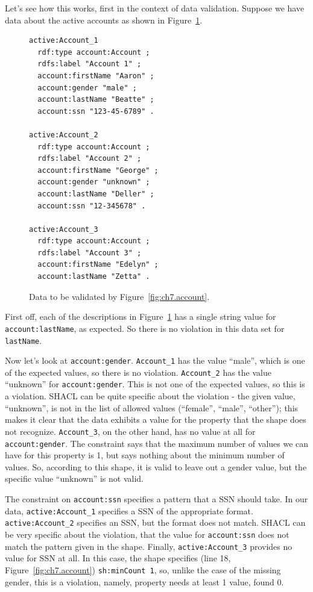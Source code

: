 Let's see how this works, first in the context
of data validation.  Suppose we have data about the active accounts as shown in
Figure~\ref{fig:ch7.data}.


\begin{figure}
  \begin{lstlisting}
active:Account_1
  rdf:type account:Account ;
  rdfs:label "Account 1" ;
  account:firstName "Aaron" ;
  account:gender "male" ;
  account:lastName "Beatte" ;
  account:ssn "123-45-6789" .

active:Account_2
  rdf:type account:Account ;
  rdfs:label "Account 2" ;
  account:firstName "George" ;
  account:gender "unknown" ;
  account:lastName "Deller" ;
  account:ssn "12-345678" .

active:Account_3
  rdf:type account:Account ;
  rdfs:label "Account 3" ;
  account:firstName "Edelyn" ;
  account:lastName "Zetta" .
  \end{lstlisting}
\label{fig:ch7.data}
\caption{Data to be validated by Figure~\protect\ref{fig:ch7.account}.}
\end{figure}

First off, each of the descriptions in Figure~\ref{fig:ch7.data} has a single string value for
\texttt{account:lastName}, as expected.  So there is no violation in this data set for \texttt{lastName}.

Now let's look at \texttt{account:gender}.  \texttt{Account\_1} has the
value ``male'', which is one of the expected values, so there is no
violation.  \texttt{Account\_2} has the value ``unknown'' for \texttt{account:gender}.  This is not one 
of the expected values, so this is a violation.  SHACL can be quite specific about
the violation - the given value, ``unknown'', is not in the list of allowed
values (``female'', ``male'', ``other''); this makes it clear that the data exhibits a value
for the property that the shape does not recognize. \texttt{Account\_3}, on the other hand, has 
no value at all for \texttt{account:gender}.  The constraint says that the
maximum number of values we can have for this property is 1, but says nothing about the
minimum number of values.  So, according to this shape, it is valid to leave out a gender value,
but the specific value ``unknown'' is not valid.  

The constraint on \texttt{account:ssn} specifies a pattern that a SSN should take.
In our data, \texttt{active:Account\_1} specifies a SSN of the appropriate format.
\texttt{active:Account\_2} specifies an SSN, but the format does not match.  SHACL can
be very specific about the violation, that the value for \texttt{account:ssn}
does not match the pattern given in the shape.  Finally, \texttt{active:Account\_3}  provides no value for SSN at all.  In this case, the shape specifies (line 18, Figure~\ref{fig:ch7.account}) \texttt{sh:minCount 1}, so, unlike the case of the missing
gender, this is a violation, namely, property needs at least 1 value, found 0.

